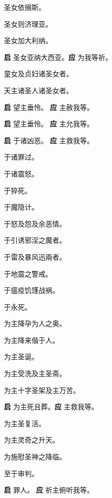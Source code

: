 \documentclass[UTF8,17pt]{ctexart}
\begin{document}
 圣⼥依搦斯。

 圣⼥则济理亚。

 圣⼥加⼤利纳。

\textbf{启} \quad 圣⼥亚纳⼤西亚。\hfill \textbf{应} \quad 为我等祈。

 童⼥及贞妇诸圣⼥者。

 天主诸圣⼈诸圣⼥者。

\textbf{启} \quad 望主垂怜。 \hfill \textbf{应} \quad 主赦我等。

\textbf{启} \quad 望主垂怜。 \hfill \textbf{应} \quad 主允我等。

\textbf{启} \quad 于诸凶恶。 \hfill \textbf{应} \quad 主救我等。

 于诸罪过。

 于诸震怒。

 于猝死。

 于魔隐计。

 于怒及怨及余恶情。

 于引诱邪淫之魔者。

 于雷及暴风迅兩者。

 于地震之警戒。

 于瘟疫饥馑战祸。

 于永死。

 为主降孕为⼈之奥。

 为主降来偕于⼈。

 为主圣诞。

 为主受洗及主圣斋。

 为主⼗字圣架及主万苦。

\textbf{启} \quad 为主死且葬。\hfill \textbf{应} \quad 主救我等。

 为主圣复活。

 为主灵奇之升天。

 为施慰圣神之降临。

 ⾄于审判。

\textbf{启} \quad 罪⼈。 \hfill \textbf{应} \quad 祈主俯听我等。
\end{document}
